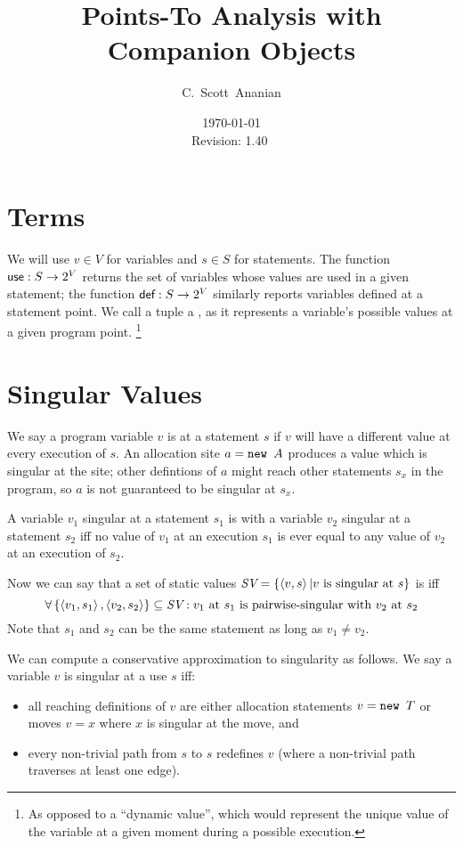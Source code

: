\documentclass[11pt,notitlepage]{article}
\author{C.~Scott~Ananian}
\title{Points-To Analysis with Companion Objects}
\date{\today \\ $ $Revision: 1.40 $ $}
\newcommand{\bigvar}[1]{\ensuremath{\text{\it #1}}}
\newcommand{\func}[1]{\ensuremath{\text{\sffamily #1}}}
\begin{document}

\maketitle
\section{Terms} %
We will use $v\in V$ for variables and $s\in S$ for statements.  The
function $\func{use}:S\to 2^V$ returns the set of variables whose
values are used in a given statement; the function $\func{def}:S\to
2^V$ similarly reports variables defined at a statement point.
We call a tuple  a , as it represents
a variable's possible values at a given program point.%
\footnote{As opposed to a ``dynamic value'', which would represent the
  unique value of the variable at a given moment during a possible execution.}

\section{Singular Values}

We say a program variable $v$ is  at a statement $s$
if $v$ will have a different value at every execution of $s$.  An
allocation site $a = \text{\tt new }A$ produces a value which is singular
at the site; other defintions of $a$ might reach other statements
$s_x$ in the program, so $a$ is not guaranteed to be singular at $s_x$.

A variable $v_1$ singular at a statement $s_1$ is
 with a variable $v_2$ singular at a statement
$s_2$ iff no value of $v_1$ at an execution $s_1$ is ever equal to any
value of $v_2$ at an execution of $s_2$.

Now we can say that a set of static values
$\bigvar{SV}=\left\{ \tuple{v,s} | v \text{ is singular at } s \right\}$
is
 iff
\begin{displaymath}
\forall \left\{ \tuple{v_1,s_1}, \tuple{v_2,s_2} \right\} \subseteq
        \bigvar{SV} :
v_1 \text{ at } s_1 \text{ is pairwise-singular with } v_2 \text{ at } s_2
\end{displaymath}
Note that $s_1$ and $s_2$ can be the same statement as long as $v_1\neq v_2$.

We can compute a conservative approximation to singularity as follows.
We say a variable $v$ is singular at a use $s$ iff:
\begin{itemize}
\item all reaching definitions of $v$ are either allocation statements 
$v = \text{\tt new }T$ or moves $v = x$ where $x$ is singular at
the move, and
\item every non-trivial path from $s$ to $s$ redefines $v$ (where a
  non-trivial path traverses at least one edge).
\end{itemize}
\end{document}

